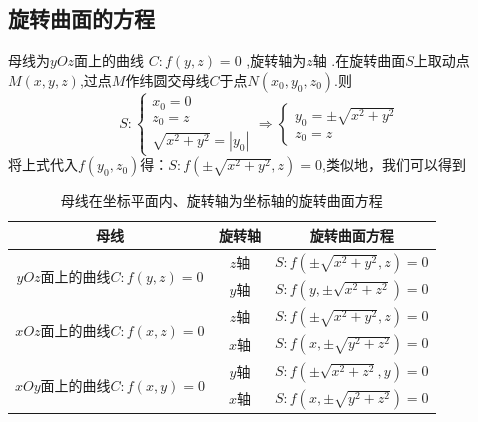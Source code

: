 \subsection{旋转曲面的方程}
\ttheorem[特殊情况的旋转曲面方程]
母线为$yOz$面上的曲线 $C:f(y,z)= 0$ ,旋转轴为$z$轴 .在旋转曲面$S$上取动点$M(x,y,z)$,过点$M$作纬圆交母线$C$于点$N(x_0,y_0,z_0)$.则
\begin{equation*}
S:
\begin{cases}
x_0=0\\
z_0=z\\
\sqrt{x^2+y^2}=|y_0|
\end{cases}
\Longrightarrow
\begin{cases}
y_0=\pm \sqrt{x^2+y^2}\\
z_0=z
\end{cases}
\end{equation*}
将上式代入$f(y_0,z_0)$得：$S:f(\pm \sqrt{x^2+y^2},z)=0$,类似地，我们可以得到
\begin{table}[h]
	\begin{center}
		\begin{tabular}{|c|c|c|}
			\hline
			母线&旋转轴  &旋转曲面方程  \\
			\hline
			\multirow{2}{*}{\hspace*{1cm}$yOz$面上的曲线$C:f(y,z)=0$} \hspace*{1cm}& $z$轴 & \hspace*{1cm}$S:f(\pm  \sqrt{x^2+y^2},z)=0$  \hspace*{1cm}\\
			\cline{2-3}
			&$y$轴   & \hspace*{1cm}$S:f(y,\pm  \sqrt{x^2+z^2})=0$ \hspace*{1cm}\\
			\hline
			\multirow{2}{*}{\hspace*{1cm}$xOz$面上的曲线$C:f(x,z)=0$\hspace*{1cm}} & $z$轴 &  \hspace*{1cm} $S:f(\pm  \sqrt{x^2+y^2},z)=0$ \hspace*{1cm}\\
			\cline{2-3}
			& $x$轴 &\hspace*{1cm} $S:f(x,\pm  \sqrt{y^2+z^2})=0$  \hspace*{1cm} \\
			\hline
			\multirow{2}{*}{\hspace*{1cm}$xOy$面上的曲线$C:f(x,y)=0$\hspace*{1cm}} & $y$轴 &  \hspace*{1cm} $S:f(\pm  \sqrt{x^2+z^2},y)=0$ \hspace*{1cm}\\
			\cline{2-3}
			& $x$轴 & \hspace*{1cm} $S:f(x,\pm  \sqrt{y^2+z^2})=0$  \hspace*{1cm} \\
			\hline
		\end{tabular}
\end{center}
\caption{母线在坐标平面内、旋转轴为坐标轴的旋转曲面方程}
\label{特殊情况的旋转曲面方程}
\end{table}

